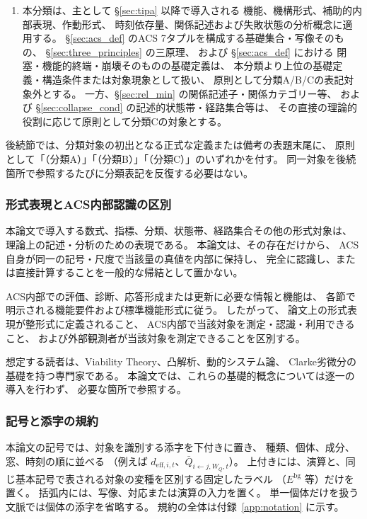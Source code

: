 \begin{remark}[三分類の適用規則]
\begin{enumerate}
  \item 本分類は、主として \S\ref{sec:tipa} 以降で導入される
        機能、機構形式、補助的内部表現、作動形式、
        時刻依存量、関係記述および失敗状態の分析概念に適用する。
        \S\ref{sec:acs_def} のACS 7タプルを構成する基礎集合・写像そのもの、
        \S\ref{sec:three_principles} の三原理、
        および \S\ref{sec:acs_def} における
        閉塞・機能的終端・崩壊そのものの基礎定義は、
        本分類より上位の基礎定義・構造条件または対象現象として扱い、
        原則として分類A/B/Cの表記対象外とする。
        一方、\S\ref{sec:rel_min} の関係記述子・関係カテゴリー等、
        および \S\ref{sec:collapse_cond} の記述的状態帯・経路集合等は、
        その直接の理論的役割に応じて原則として分類Cの対象とする。
\end{enumerate}

後続節では、分類対象の初出となる正式な定義または備考の表題末尾に、
原則として「（分類A）」「（分類B）」「（分類C）」のいずれかを付す。
同一対象を後続箇所で参照するたびに分類表記を反復する必要はない。
\end{remark}

\subsubsection{形式表現とACS内部認識の区別}
\label{subsec:description_levels_global}

本論文で導入する数式、指標、分類、状態帯、経路集合その他の形式対象は、
理論上の記述・分析のための表現である。
本論文は、その存在だけから、
ACS自身が同一の記号・尺度で当該量の真値を内部に保持し、
完全に認識し、または直接計算することを一般的な帰結として置かない。

ACS内部での評価、診断、応答形成または更新に必要な情報と機能は、
各節で明示される機能要件および標準機能形式に従う。
したがって、
論文上の形式表現が整形式に定義されること、
ACS内部で当該対象を測定・認識・利用できること、
および外部観測者が当該対象を測定できることを区別する。

想定する読者は、Viability Theory、凸解析、動的システム論、
Clarke劣微分の基礎を持つ専門家である。
本論文では、これらの基礎的概念については逐一の導入を行わず、
必要な箇所で参照する。

\subsubsection{記号と添字の規約}
\label{subsec:notation}

本論文の記号では、対象を識別する添字を下付きに置き、
種類、個体、成分、窓、時刻の順に並べる
（例えば $d_{\mathrm{eff},i,t}$、$\bar Q_{i\leftarrow j,W_Q,t}$）。
上付きには、演算と、同じ基本記号で表される対象の変種を区別する固定したラベル
（$E^{\mathrm{bg}}$ 等）だけを置く。
括弧内には、写像、対応または演算の入力を置く。
単一個体だけを扱う文脈では個体の添字を省略する。
規約の全体は付録~\ref{app:notation} に示す。

